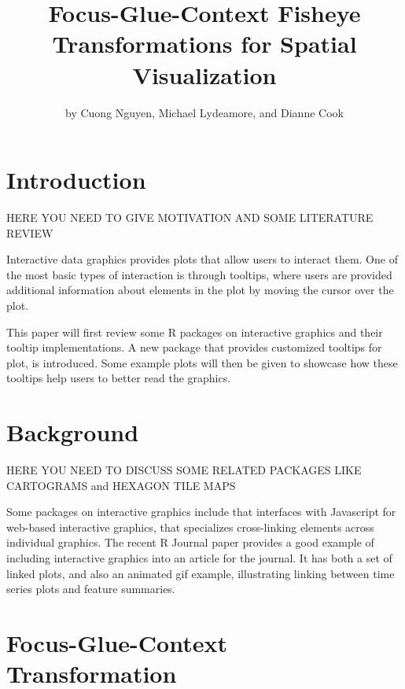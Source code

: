\title{Focus-Glue-Context Fisheye Transformations for Spatial Visualization}


\author{by Cuong Nguyen, Michael Lydeamore, and Dianne Cook}

\maketitle


\section{Introduction}\label{introduction}

HERE YOU NEED TO GIVE MOTIVATION AND SOME LITERATURE REVIEW

Interactive data graphics provides plots that allow users to interact them. One of the most basic types of interaction is through tooltips, where users are provided additional information about elements in the plot by moving the cursor over the plot.

This paper will first review some R packages on interactive graphics and their tooltip implementations. A new package  that provides customized tooltips for plot, is introduced. Some example plots will then be given to showcase how these tooltips help users to better read the graphics.

\section{Background}\label{background}

HERE YOU NEED TO DISCUSS SOME RELATED PACKAGES LIKE CARTOGRAMS and HEXAGON TILE MAPS

Some packages on interactive graphics include  \citep{plotly} that interfaces with Javascript for web-based interactive graphics,  \citep{crosstalk} that specializes cross-linking elements across individual graphics. The recent R Journal paper  \citep{RJ-2021-050} provides a good example of including interactive graphics into an article for the journal. It has both a set of linked plots, and also an animated gif example, illustrating linking between time series plots and feature summaries.

\section{Focus-Glue-Context Transformation}\label{focus-glue-context-transformation}

